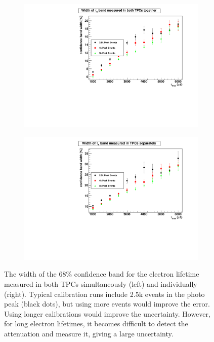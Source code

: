 \documentclass[herrin-thesis.tex]{subfiles}
\begin{document}
\begin{figure}[htbp]
\begin{subfigure}[b]{0.5\linewidth}
\centering
\includegraphics[width=1.0\columnwidth]{./plots/el_sim_width_both.pdf}
\end{subfigure}%
\begin{subfigure}[b]{0.5\linewidth}
\centering
\includegraphics[width=1.0\columnwidth]{./plots/el_sim_width_indiv.pdf}
\end{subfigure}
\caption[Confidence band widths for electron lifetime measurements]{The width of the 68\% confidence band for the electron lifetime measured in both TPCs simultaneously (left) and individually (right). Typical calibration runs include 2.5k events in the photo peak (black dots), but using more events would improve the error. Using longer calibrations would improve the uncertainty. However, for long electron lifetimes, it becomes difficult to detect the attenuation and measure it, giving a large uncertainty.}
\label{fig:sim_width}
\end{figure}
\end{document}

